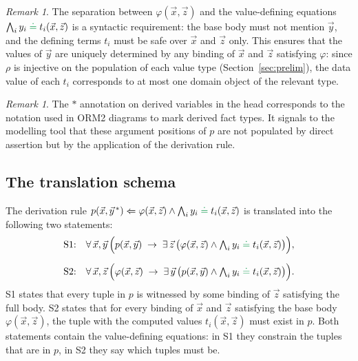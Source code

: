 \documentclass[11pt]{amsart}
\theoremstyle{definition}
\theoremstyle{remark}
\newtheorem{remark}[theorem]{Remark}
\newcommand{\dataEq}{\mathrel{\textcolor{ForestGreen}{\doteq}}}
\begin{document}
\begin{remark}
The separation between $\varphi(\vec{x}, \vec{z})$ and the value-defining
equations $\bigwedge_i y_i \dataEq t_i(\vec{x}, \vec{z})$ is a syntactic
requirement: the base body must not mention $\vec{y}$, and the defining
terms $t_i$ must be safe over $\vec{x}$ and $\vec{z}$ only. This ensures
that the values of $\vec{y}$ are uniquely determined by any binding of
$\vec{x}$ and $\vec{z}$ satisfying $\varphi$: since $\rho$ is injective on
the population of each value type (Section~\ref{sec:prelim}), the data value
of each $t_i$ corresponds to at most one domain object of the relevant type.
\end{remark}

\begin{remark}
The $*$ annotation on derived variables in the head corresponds to the
notation used in ORM2 diagrams to mark derived fact types. It signals to
the modelling tool that these argument positions of $p$ are not populated
by direct assertion but by the application of the derivation rule.
\end{remark}

\subsection*{The translation schema}

The derivation rule $p(\vec{x}, \vec{y}^{\,*}) \Leftarrow \varphi(\vec{x},
\vec{z}) \wedge \bigwedge_i y_i \dataEq t_i(\vec{x}, \vec{z})$ is
translated into the following two statements:
\begin{align*}
\text{S1:} \quad & \forall\, \vec{x}, \vec{y} \,
  \Bigl( p(\vec{x}, \vec{y}) \;\to\;
    \exists\, \vec{z} \,\bigl( \varphi(\vec{x}, \vec{z}) \wedge
      \textstyle\bigwedge_i y_i \dataEq t_i(\vec{x}, \vec{z}) \bigr) \Bigr),
      \\[6pt]
\text{S2:} \quad & \forall\, \vec{x}, \vec{z} \,
  \Bigl( \varphi(\vec{x}, \vec{z}) \;\to\;
    \exists\, \vec{y} \,\bigl( p(\vec{x}, \vec{y}) \wedge
      \textstyle\bigwedge_i y_i \dataEq t_i(\vec{x}, \vec{z}) \bigr) \Bigr).
\end{align*}
S1 states that every tuple in $p$ is witnessed by some binding of $\vec{z}$
satisfying the full body. S2 states that for every binding of $\vec{x}$ and
$\vec{z}$ satisfying the base body $\varphi(\vec{x}, \vec{z})$, the tuple
with the computed values $t_i(\vec{x}, \vec{z})$ must exist in $p$. Both
statements contain the value-defining equations: in S1 they constrain the
tuples that are in $p$, in S2 they say which tuples must be.
\end{document}
